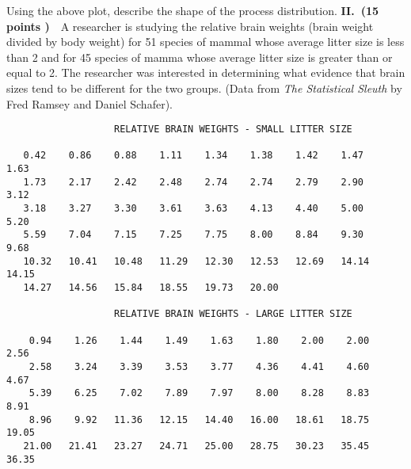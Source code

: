 \documentclass[10pt]{report}
\def\vvn{\vskip2mm\noindent}
\begin{document}
Using the above plot, describe the shape of the process distribution.
\vskip3mm
\vvn
{\bf II.\ (15 points )}\ \  A researcher is studying the relative brain weights (brain weight divided by body weight) for 51 species of mammal whose average litter size is less than 2 and for 45 species of mamma whose average litter size is greater than or equal to 2. The researcher was interested in determining what evidence that brain sizes tend to be different for
    the two groups. (Data from {\it The Statistical Sleuth} by Fred Ramsey and Daniel Schafer).
  \vvn
  \footnotesize
  \begin{verbatim}
                   RELATIVE BRAIN WEIGHTS - SMALL LITTER SIZE

   0.42    0.86    0.88    1.11    1.34    1.38    1.42    1.47    1.63
   1.73    2.17    2.42    2.48    2.74    2.74    2.79    2.90    3.12
   3.18    3.27    3.30    3.61    3.63    4.13    4.40    5.00    5.20
   5.59    7.04    7.15    7.25    7.75    8.00    8.84    9.30    9.68
   10.32   10.41   10.48   11.29   12.30   12.53   12.69   14.14   14.15
   14.27   14.56   15.84   18.55   19.73   20.00

                   RELATIVE BRAIN WEIGHTS - LARGE LITTER SIZE

    0.94    1.26    1.44    1.49    1.63    1.80    2.00    2.00    2.56
    2.58    3.24    3.39    3.53    3.77    4.36    4.41    4.60    4.67
    5.39    6.25    7.02    7.89    7.97    8.00    8.28    8.83    8.91
    8.96    9.92   11.36   12.15   14.40   16.00   18.61   18.75   19.05
   21.00   21.41   23.27   24.71   25.00   28.75   30.23   35.45   36.35
  \end{verbatim}
  \normalsize
\vvn
\end{document}
